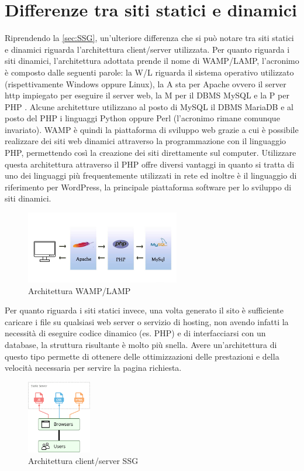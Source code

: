 \documentclass[target=bach,aauheader=]{thud}
\begin{document}
\section{Differenze tra siti statici e dinamici}
Riprendendo la \cref{sec:SSG}, un'ulteriore differenza che si può notare tra siti statici e dinamici riguarda l'architettura client/server utilizzata. \newline
Per quanto riguarda i siti dinamici, l'architettura adottata prende il nome di WAMP/LAMP, l'acronimo è composto dalle seguenti parole: la W/L riguarda il sistema operativo utilizzato (rispettivamente Windows oppure Linux),
la A sta per Apache ovvero il server http impiegato per eseguire il server web, la M per il DBMS MySQL e la P per PHP \cite{andrzej2007development}. Alcune architetture utilizzano al posto di MySQL il DBMS MariaDB e al posto del PHP i linguaggi Python oppure Perl (l'acronimo rimane comunque invariato). \newline
WAMP è quindi la piattaforma di sviluppo web grazie a cui è possibile realizzare dei siti web dinamici attraverso la programmazione con il linguaggio PHP, permettendo così la creazione dei siti direttamente sul computer. 
Utilizzare questa architettura attraverso il PHP offre diversi vantaggi in quanto si tratta di uno dei linguaggi più frequentemente utilizzati in rete ed inoltre è il linguaggio di riferimento per WordPress, la principale piattaforma software per lo sviluppo di siti dinamici. 
\begin{figure}
    \centering
    \includegraphics[width = 0.6\textwidth]{images/WAMP_LAMP.png}
    \caption{Architettura WAMP/LAMP}
\end{figure}
\newline
Per quanto riguarda i siti statici invece, una volta generato il sito è sufficiente caricare i file su qualsiasi web server o servizio di hosting, non avendo infatti la necessità di eseguire codice dinamico (es. PHP) e di interfacciarsi con un database, la struttura risultante è molto più snella. 
Avere un'architettura di questo tipo permette di ottenere delle ottimizzazioni delle prestazioni e della velocità necessaria per servire la pagina richiesta. 
\begin{figure}[h]
    \centering
    \includegraphics[width = 0.25\textwidth]{images/static.png}
    \caption{Architettura client/server SSG}
    \label{img:architettura}
\end{figure}
\end{document}
